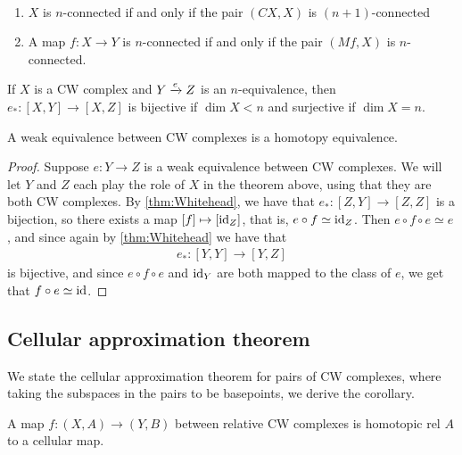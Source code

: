 \documentclass{article}[11pt]
\begin{document}
\begin{exercise} $\ $
\begin{enumerate}
	\item $X$ is $n$-connected if and only if the pair $(CX,X)$ is $(n+1)$-connected
	\item A map $f: X\to Y$ is $n$-connected if and only if the pair $(Mf, X)$ is $n$-connected.
\end{enumerate}
\end{exercise}

\begin{theorem}\label{thm:Whitehead} If $X$ is a CW complex and $Y\xrightarrow{e} Z$ is an $n$-equivalence, then $e_\ast : [X,Y] \to [X,Z]$ is bijective if $\dim X < n$ and surjective if $\dim X = n$.
\end{theorem}

\begin{corollary} A weak equivalence between CW complexes is a homotopy equivalence.
\end{corollary}
\begin{proof} Suppose $e: Y \to Z$ is a weak equivalence between CW complexes. We will let $Y$ and $Z$ each play the role of $X$ in the theorem above, using that they are both CW complexes. By  \autoref{thm:Whitehead}, we have that $e_\ast : [Z,Y] \to [Z,Z]$ is a bijection, so there exists a map $[f]\mapsto [\text{id}_Z]$, that is, $e\circ f \simeq \text{id}_Z$. Then $e\circ f\circ e \simeq e$, and since again by \autoref{thm:Whitehead} we have that 
\begin{align*}
	e_\ast : [Y,Y] \to [Y,Z]
\end{align*}
is bijective, and since $e\circ f\circ e$ and $\text{id}_Y$ are both mapped to the class of $e$, we get that $f\circ e \simeq \text{id}$.
\end{proof}

\subsection{Cellular approximation theorem}

We state the cellular approximation theorem for pairs of CW complexes, where taking the subspaces in the pairs to be basepoints, we derive the corollary.

\begin{theorem}\label{thm:cellular-approximation} A map $f:(X,A) \to (Y,B)$ between relative CW complexes is homotopic rel $A$ to a cellular map.
\end{theorem}
\end{document}
